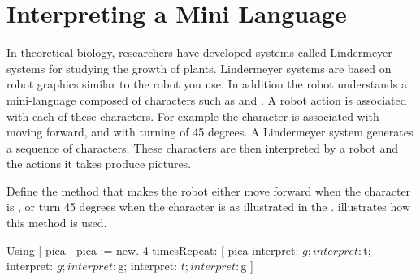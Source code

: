 \section{Interpreting a Mini Language}





In theoretical biology, researchers have developed systems called Lindermeyer systems for studying  the growth of plants. Lindermeyer systems are based on robot graphics similar to the robot you use. In addition the robot understands a mini-language composed of characters such as  and . A robot action is associated with each of these characters. For example the character  is associated with moving forward, and  with turning of 45 degrees. A Lindermeyer system generates a sequence of characters. These characters are then interpreted by a robot and the actions it takes  produce pictures. 


Define the method  that makes the robot either move forward when the character is , or turn 45 degrees when the character is  as illustrated in the .  illustrates how this method is used.

\begin{scriptwithtitle}{Using }\label{src:interpret}
| pica |
pica := \Turtle new. 
4 timesRepeat: 
   [ pica  
       interpret: $g;
       interpret: $t;
       interpret: $g; 
       interpret: $g;
       interpret: $t;
       interpret: $g ]
\end{scriptwithtitle}

